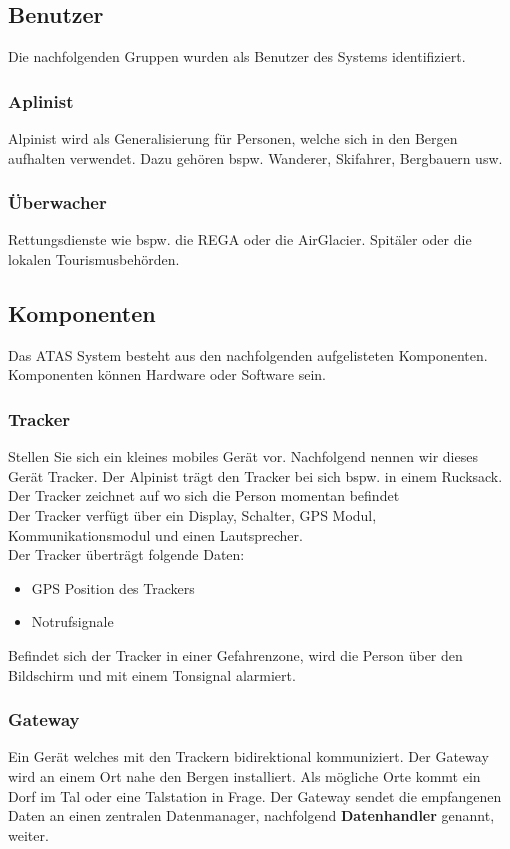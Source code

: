 \documentclass[11pt,english,german]{report}
\theoremstyle{definition}
\begin{document}
\newpage
\subsection{Benutzer}
Die nachfolgenden Gruppen wurden als Benutzer des Systems identifiziert.

\subsubsection{Aplinist}
Alpinist wird als Generalisierung für Personen, welche sich in den Bergen aufhalten verwendet. Dazu gehören bspw. Wanderer, Skifahrer, Bergbauern usw.

\subsubsection{Überwacher}
Rettungsdienste wie bspw. die REGA oder die AirGlacier. Spitäler oder die lokalen Tourismusbehörden.

\subsection{Komponenten}
Das ATAS System besteht aus den nachfolgenden aufgelisteten Komponenten. Komponenten können Hardware oder Software sein.

\subsubsection{Tracker}
Stellen Sie sich ein kleines mobiles Gerät vor. Nachfolgend nennen wir dieses Gerät Tracker. Der Alpinist trägt den Tracker bei sich bspw. in einem Rucksack. Der Tracker zeichnet auf wo sich die Person momentan befindet\\ [0.3cm] 
Der Tracker verfügt über ein Display, Schalter, GPS Modul, Kommunikationsmodul und einen Lautsprecher.\\ [0.3cm]
Der Tracker überträgt folgende Daten:
\begin{itemize}
	\item GPS Position des Trackers
	\item Notrufsignale
\end{itemize}
Befindet sich der Tracker in einer Gefahrenzone, wird die Person über den Bildschirm und mit einem Tonsignal alarmiert.
\subsubsection{Gateway}
Ein Gerät welches mit den Trackern bidirektional kommuniziert. Der Gateway wird an einem Ort nahe den Bergen installiert. Als mögliche Orte kommt ein Dorf im Tal oder eine Talstation in Frage. Der Gateway sendet die empfangenen Daten an einen zentralen Datenmanager, nachfolgend \textbf{Datenhandler} genannt, weiter.
\end{document}
